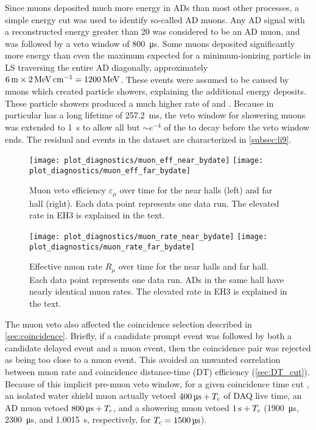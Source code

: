 Since muons deposited much more energy in ADs than most other processes,
a simple energy cut was used to identify so-called AD muons.
Any AD signal with a reconstructed energy greater than \SI{20}{\mev}
was considered to be an AD muon, and was followed by a veto window
of \SI{800}{\micro\second}.
Some muons deposited significantly more energy than
even the maximum expected for a minimum-ionizing particle in LS
traversing the entire AD diagonally, approximately
$\SI{6}{\meter}\times\SI{2}{\mev\per\cm}=\SI{1200}{\mev}$.
These events were assumed to be caused by muons which created particle showers,
explaining the additional energy deposits.
These particle showers produced a much higher rate of
\li{} and \he{}.
Because \li{} in particular has a long lifetime of \SI{257.2}{\milli\second},
the veto window for showering muons was extended to \SI{1}{\second}
to allow all but ${\sim}e^{-4}$ of the \li{} to decay before the veto window ends.
The residual \li{} and \he{} events in the dataset are characterized
in \cref{subsec:li9}.

\begin{figure}
    \centering
    \texttt{[image: plot\_diagnostics/muon\_eff\_near\_bydate]}
    \texttt{[image: plot\_diagnostics/muon\_eff\_far\_bydate]}
    \caption[Muon veto efficiency over time]{
        Muon veto efficiency $\varepsilon_\mu$ over time for
        the near halls (left) and far hall (right).
        Each data point represents one data run.
        The elevated rate in EH3 is explained in the text.
    }
    \label{fig:veto_eff}
\end{figure}

\begin{figure}
    \centering
    \texttt{[image: plot\_diagnostics/muon\_rate\_near\_bydate]}
    \texttt{[image: plot\_diagnostics/muon\_rate\_far\_bydate]}
    \caption[Effective muon rate over time]{
        Effective muon rate $R_\mu$ over time for the near halls and far hall.
        Each data point represents one data run.
        ADs in the same hall have nearly identical muon rates.
        The elevated rate in EH3 is explained in the text.
    }
    \label{fig:muon_rate}
\end{figure}

The muon veto also affected the coincidence selection
described in \cref{sec:coincidence}.
Briefly, if a candidate prompt event was followed
by both a candidate delayed event and a muon event,
then the coincidence pair was rejected as being too close to a muon event.
This avoided an unwanted correlation between muon rate
and coincidence distance-time (DT) efficiency (\cref{sec:DT_cut}).
Because of this implicit pre-muon veto window,
for a given coincidence time cut \tc,
an isolated water shield muon actually vetoed $\SI{400}{\micro\second}+T_c$
of DAQ live time,
an AD muon vetoed $\SI{800}{\micro\second}+T_c$,
and a showering muon vetoed $\SI{1}{\second}+T_c$
(\SI{1900}{\us}, \SI{2300}{\us}, and \SI{1.0015}{\s}, respectively,
for $\tc=\SI{1500}{\us}$).

